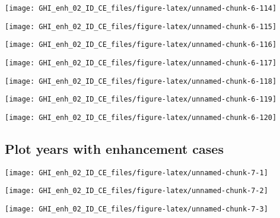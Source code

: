 \documentclass[
  10pt,
  a4paper,oneside]{article}
\begin{document}
\begin{center}\texttt{[image: GHI\_enh\_02\_ID\_CE\_files/figure-latex/unnamed-chunk-6-114]} \end{center}

\begin{center}\texttt{[image: GHI\_enh\_02\_ID\_CE\_files/figure-latex/unnamed-chunk-6-115]} \end{center}

\begin{center}\texttt{[image: GHI\_enh\_02\_ID\_CE\_files/figure-latex/unnamed-chunk-6-116]} \end{center}

\begin{center}\texttt{[image: GHI\_enh\_02\_ID\_CE\_files/figure-latex/unnamed-chunk-6-117]} \end{center}

\begin{center}\texttt{[image: GHI\_enh\_02\_ID\_CE\_files/figure-latex/unnamed-chunk-6-118]} \end{center}

\begin{center}\texttt{[image: GHI\_enh\_02\_ID\_CE\_files/figure-latex/unnamed-chunk-6-119]} \end{center}

\begin{center}\texttt{[image: GHI\_enh\_02\_ID\_CE\_files/figure-latex/unnamed-chunk-6-120]} \end{center}

\hypertarget{plot-years-with-enhancement-cases}{%
\subsection{Plot years with enhancement cases}\label{plot-years-with-enhancement-cases}}

\begin{center}\texttt{[image: GHI\_enh\_02\_ID\_CE\_files/figure-latex/unnamed-chunk-7-1]} \end{center}

\begin{center}\texttt{[image: GHI\_enh\_02\_ID\_CE\_files/figure-latex/unnamed-chunk-7-2]} \end{center}

\begin{center}\texttt{[image: GHI\_enh\_02\_ID\_CE\_files/figure-latex/unnamed-chunk-7-3]} \end{center}
\end{document}
